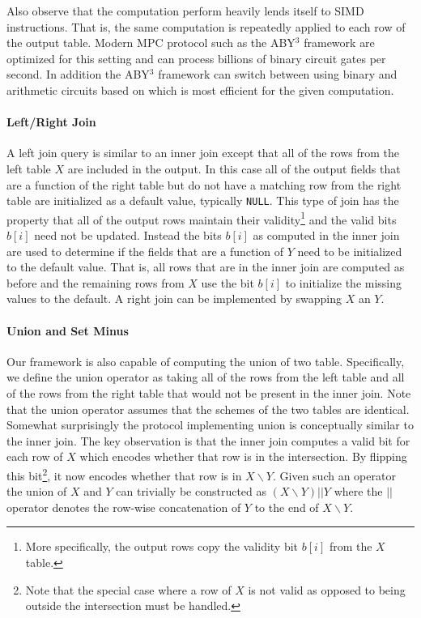 Also observe that the computation perform heavily lends itself to SIMD instructions. That is, the same computation is repeatedly applied to each row of the output table. Modern MPC protocol such as the ABY$^3$ framework \cite{aby3,highthroughput} are optimized for this setting and can process billions of binary circuit gates per second\cite{highthroughput}. In addition the ABY$^3$ framework can switch between using binary and arithmetic circuits based on which is most efficient for the given computation. 

\paragraph{Left/Right Join}

A left join query is similar to an inner join except that all of the rows from the left table $X$ are included in the output. In this case all of the output fields that are a function of the right table but do not have a matching row from the right table are initialized as a default value, typically \texttt{NULL}.  This type of join has the property that all of the output rows maintain their validity\footnote{More specifically, the output rows copy the validity bit $b[i]$ from the $X$ table.} and the valid bits $b[i]$ need not be updated. Instead the bits $b[i]$ as computed in the inner join are used to determine if the fields that are a function of $Y$ need to be initialized to the default value. That is, all rows that are in the inner join are computed as before and the remaining rows from $X$ use the bit $b[i]$ to initialize the missing values to the default. A right join can be implemented by swapping $X$ an $Y$.

\paragraph{Union and Set Minus}

Our framework is also capable of computing the union of two table. Specifically, we define the union operator as taking all of the rows from the left table and all of the rows from the right table that would not be present in the inner join. Note that the union operator assumes that the schemes of the two tables are identical. Somewhat surprisingly the protocol implementing union is conceptually similar to the inner join. The key observation is that the inner join computes a valid bit for each row of $X$ which encodes whether that row is in the intersection. By flipping this bit\footnote{Note that the special case where a row of $X$ is not valid as opposed to being outside the intersection must be handled.}, it now encodes whether that row is in $X\backslash Y$. Given such an operator the union of $X$ and $Y$ can trivially be constructed as $(X\backslash Y) || Y$ where the $||$ operator denotes the row-wise concatenation of $Y$ to the end of $X\backslash Y$.


